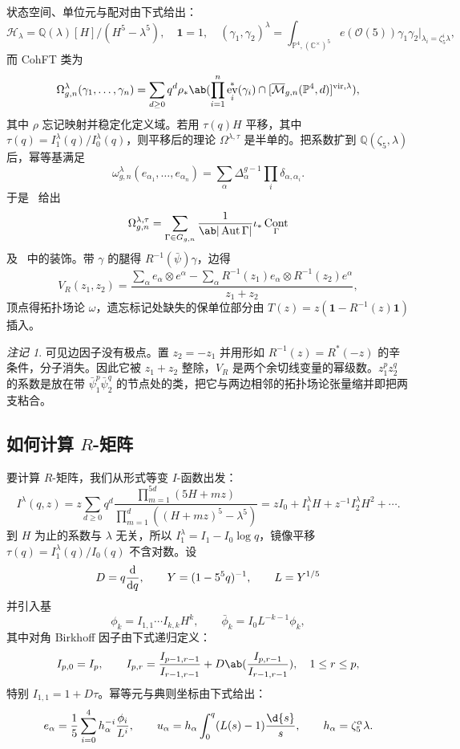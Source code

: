 \documentclass{amsart}
\theoremstyle{definition}
\theoremstyle{remark}
\newtheorem{rmk}[thm]{注记}
\theoremstyle{plain}
\theoremstyle{definition}
\theoremstyle{remark}
\newcommand{\C}{\mathbb{C}}
\newcommand{\Q}{\mathbb{Q}}
\renewcommand{\P}{\mathbb{P}}
\newcommand{\Mbar}{\overline{\mathcal{M}}}
\newcommand{\mc}[1]{\mathcal{#1}}
\newcommand{\mr}[1]{\mathrm{#1}}
\newcommand{\1}{\mathbf{1}}
\newcommand{\2}{\mathbf{2}}
\newcommand{\3}{\mathbf{3}}
\newcommand{\vir}{\mr{vir}}
\DeclareMathOperator{\Aut}{Aut}
\DeclareMathOperator{\ev}{ev}
\DeclareMathOperator{\Cont}{Cont}
\begin{document}
状态空间、单位元与配对由下式给出：
\[ \mc{H}_{\lambda} = \Q(\lambda)[H]/(H^5-\lambda^5), \quad \1 = 1, \quad (\gamma_1,\gamma_2)^{\lambda} = \int_{\P^4, (\C^{\times})^5} e(\mc{O}(5))\gamma_1\gamma_2 \Big|_{\lambda_i = \zeta_5^i\lambda}, \]
而 CohFT 类为
\[ \Omega^{\lambda}_{g,n}(\gamma_1, \ldots, \gamma_n) = \sum_{d \geq 0} q^d \rho_* \ab( \prod_{i=1}^n \ev_i^*(\gamma_i) \cap [\Mbar_{g,n}(\P^4,d)]^{\vir,\lambda}), \]
其中 \(\rho\) 忘记映射并稳定化定义域。若用 \(\tau(q)H\) 平移，其中 \(\tau(q) = I^{\lambda}_1(q)/I^{\lambda}_0(q)\)，则平移后的理论 \(\Omega^{\lambda,\tau}\) 是半单的。把系数扩到 \(\Q(\zeta_5,\lambda)\) 后，幂等基满足
\[ \omega^{\lambda}_{g,n}(e_{\alpha_1}, \ldots, e_{\alpha_n}) = \sum_{\alpha}\Delta_{\alpha}^{g-1}\prod_i \delta_{\alpha,\alpha_i}. \]
于是~ 给出
\[ \Omega^{\lambda,\tau}_{g,n} = \sum_{\Gamma \in G_{g,n}} \frac{1}{\ab|\Aut\Gamma|}\iota_* \Cont_{\Gamma} \]
及~ 中的装饰。带 \(\gamma\) 的腿得 \(R^{-1}(\bar{\psi})\gamma\)，边得
\[ V_R(z_1,z_2) = \frac{\sum_{\alpha} e_{\alpha}\otimes e^{\alpha} - \sum_{\alpha} R^{-1}(z_1)e_{\alpha} \otimes R^{-1}(z_2)e^{\alpha}}{z_1+z_2}, \]
顶点得拓扑场论 \(\omega\)，遗忘标记处缺失的保单位部分由 \(T(z) = z(\1 - R^{-1}(z)\1)\) 插入。

\begin{rmk}
    可见边因子没有极点。置 \(z_2 = -z_1\) 并用形如 \(R^{-1}(z) = R^*(-z)\) 的辛条件，分子消失。因此它被 \(z_1+z_2\) 整除，\(V_R\) 是两个余切线变量的幂级数。\(z_1^p z_2^q\) 的系数是放在带 \(\bar{\psi}_1^p \bar{\psi}_2^q\) 的节点处的类，把它与两边相邻的拓扑场论张量缩并即把两支粘合。
\end{rmk}

\subsection{如何计算 \(R\)-矩阵}%
\label{sub:How to compute the R-matrix (Guo)}

要计算 \(R\)-矩阵，我们从形式等变 \(I\)-函数出发：
\[ I^{\lambda}(q,z) = z\sum_{d\geq0}q^d \frac{\prod_{m=1}^{5d}(5H+mz)}{\prod_{m=1}^d ((H+mz)^5 - \lambda^5)} = zI_0 + I_1^{\lambda}H + z^{-1}I_2^{\lambda}H^2 + \cdots. \]
到 \(H\) 为止的系数与 \(\lambda\) 无关，所以 \(I_1^{\lambda} = I_1 - I_0 \log q\)，镜像平移 \(\tau(q) = I_1^{\lambda}(q)/I_0(q)\) 不含对数。设
\[ D = q\odv{}{q}, \qquad Y = (1-5^5q)^{-1}, \qquad L = Y^{1/5} \]
并引入基
\[ \phi_k = I_{1,1}\cdots I_{k,k}H^k, \qquad \bar{\phi}_k = I_0 L^{-k-1}\phi_k, \]
其中对角 Birkhoff 因子由下式递归定义：
\[ I_{p,0} = I_p, \qquad I_{p,r} = \frac{I_{p-1,r-1}}{I_{r-1,r-1}} + D \ab( \frac{I_{p,r-1}}{I_{r-1,r-1}}), \quad 1 \leq r \leq p, \]
特别 \(I_{1,1} = 1+D\tau\)。幂等元与典则坐标由下式给出：
\[ e_{\alpha} = \frac{1}{5}\sum_{i=0}^4 h_{\alpha}^{-i}\frac{\phi_i}{L^i}, \qquad u_{\alpha} = h_{\alpha}\int_0^q (L(s)-1)\frac{\d{s}}{s}, \qquad h_{\alpha} = \zeta_5^{\alpha}\lambda. \]
\end{document}
